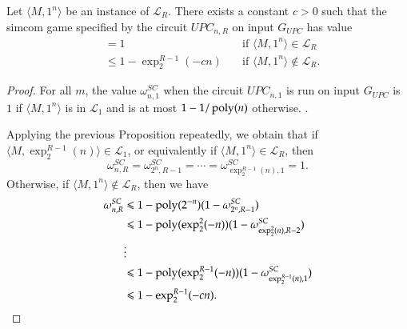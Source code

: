\begin{corollary}
\label{cor:recursive_enl}
Let $\langle M,1^n \rangle$ be an instance of $\mathcal{L}_R$. There exists a constant $c > 0$ such that the simcom game specified by the circuit $UPC_{n,R}$ on input $G_{UPC}$ has value 
\begin{align*}
		&= 1  \quad & \text{if } \langle M,1^n \rangle\in \mathcal{L}_R \\
		&\leq 1 - \exp^{R-1}_2(-cn) \quad &\text{if } \langle M,1^n \rangle\notin \mathcal{L}_R.
\end{align*}
\end{corollary}
\begin{proof}
	For all $m$, the value $\omega_{n,1}^{SC}$ when the circuit $UPC_{n,1}$ is run on input $G_{UPC}$ is $1$ if $\langle M,1^n \rangle$ is in $\mathcal{L}_1$ and is at most $1 - 1/\operatorname{poly}(n)$ otherwise. .
	
	Applying the previous Proposition repeatedly, we obtain that if $\langle M,\exp^{R-1}_2(n) \rangle \in \mathcal{L}_1$, or equivalently if $\langle M,1^n \rangle \in \mathcal{L}_R$, then
	\[
		\omega_{n,R}^{SC} = \omega_{2^n,R-1}^{SC} = \cdots = \omega_{\exp^{R-1}_2(n),1}^{SC} = 1.
	\]
	Otherwise, if  $\langle M,1^n \rangle \notin \mathcal{L}_R$, then we have
	\begin{align*}
		\omega_{n,R}^{SC} &\leqslant 1 - \operatorname{poly}(2^{-n})(1-\omega_{2^n,R-1}^{SC}) \\
					&\leqslant 1 - \operatorname{poly}(\exp^2_2(-n))(1- \omega_{\exp^2_2(n),R-2}^{SC}) \\
					&\vdots \\
					&\leqslant 1 - \operatorname{poly}(\exp^{R-1}_2(-n))(1-\omega_{\exp^{R-1}_2(n),1}^{SC}) \\
					&\leqslant 1 - \exp^{R-1}_2(-cn).
	\end{align*}
\end{proof}


